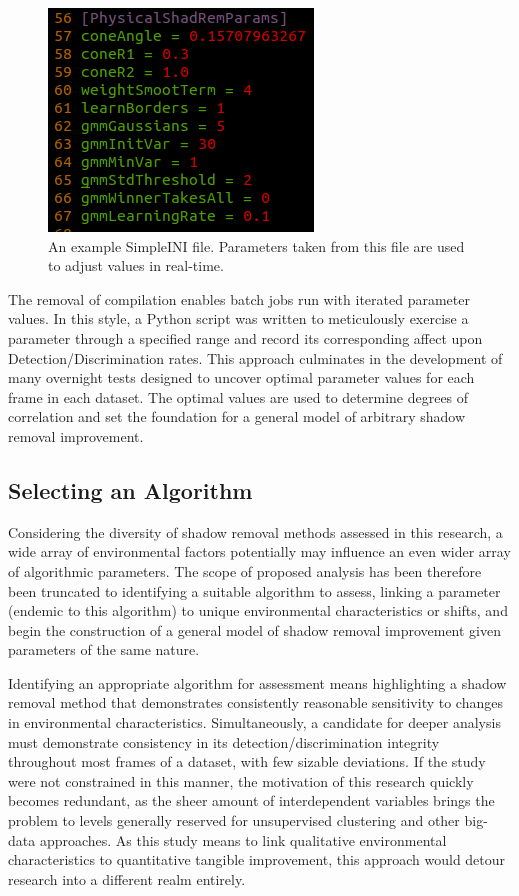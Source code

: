 \documentclass[12pt]{report}
\begin{document}
\begin{figure}
  \centering
  \includegraphics[width=.5\linewidth]{figures/simpleini.png}
  \caption{An example SimpleINI file. Parameters taken from this file are used to adjust values in real-time.}
  \label{fig:simpleini}
\end{figure}

The removal of compilation enables batch jobs run with iterated parameter values. In this style, a Python script was written to meticulously exercise a parameter through a specified range and record its corresponding affect upon Detection/Discrimination rates. This approach culminates in the development of many overnight tests designed to uncover optimal parameter values for each frame in each dataset. The optimal values are used to determine degrees of correlation and set the foundation for a general model of arbitrary shadow removal improvement.

\subsection{Selecting an Algorithm} \label{section:selectalgorithm}

Considering the diversity of shadow removal methods assessed in this research, a wide array of environmental factors potentially may influence an even wider array of algorithmic parameters. The scope of proposed analysis has been therefore been truncated to identifying a suitable algorithm to assess, linking a parameter (endemic to this algorithm) to unique environmental characteristics or shifts, and begin the construction of a general model of shadow removal improvement given parameters of the same nature.

Identifying an appropriate algorithm for assessment means highlighting a shadow removal method that demonstrates consistently reasonable sensitivity to changes in environmental characteristics. Simultaneously, a candidate for deeper analysis must demonstrate consistency in its detection/discrimination integrity throughout most frames of a dataset, with few sizable deviations. If the study were not constrained in this manner, the motivation of this research quickly becomes redundant, as the sheer amount of interdependent variables brings the problem to levels generally reserved for unsupervised clustering and other big-data approaches. As this study means to link qualitative environmental characteristics to quantitative tangible improvement, this approach would detour research into a different realm entirely.
\end{document}
